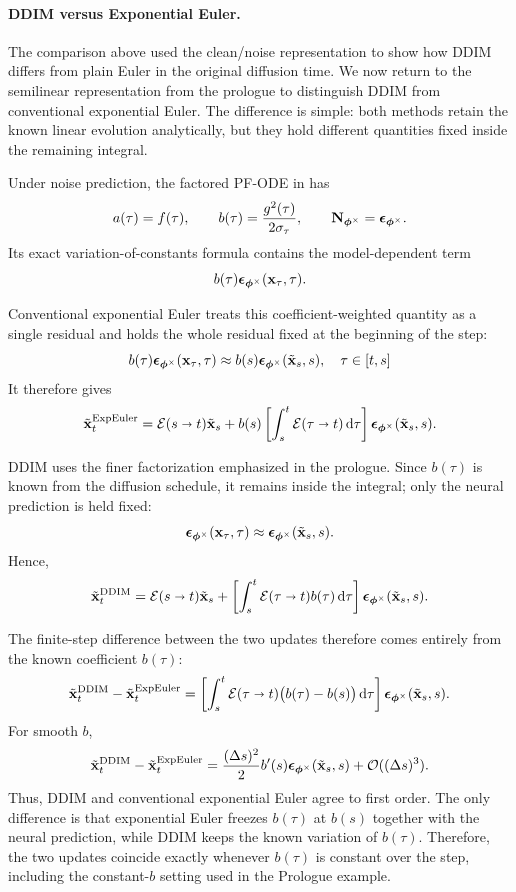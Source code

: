 \paragraph{DDIM versus Exponential Euler.}
The comparison above used the clean/noise representation to show how DDIM
differs from plain Euler in the original diffusion time. We now return to the
semilinear representation from the prologue to distinguish DDIM from
conventional exponential Euler. The difference is simple: both methods retain
the known linear evolution analytically, but they hold different quantities
fixed inside the remaining integral.

Under noise prediction, the factored PF-ODE in
 has
\[
a(\tau)=f(\tau),
\qquad
b(\tau)=\frac{g^2(\tau)}{2\sigma_\tau},
\qquad
{\mathbf{N}}_{\bm{\phi}^\times}
=
{\bm{\epsilon}}_{\bm{\phi}^\times}.
\]
Its exact variation-of-constants formula contains the model-dependent term
\[
b(\tau){\bm{\epsilon}}_{\bm{\phi}^\times}({\mathbf{x}}_\tau,\tau).
\]

Conventional exponential Euler treats this coefficient-weighted quantity as a
single residual and holds the whole residual fixed at the beginning of the
step:
\[
b(\tau){\bm{\epsilon}}_{\bm{\phi}^\times}({\mathbf{x}}_\tau,\tau)
\approx
b(s){\bm{\epsilon}}_{\bm{\phi}^\times}(\tilde{{\mathbf{x}}}_s,s), \quad\tau\in[t,s]
\]
It therefore gives
\[
\tilde{{\mathbf{x}}}_t^{\mathrm{ExpEuler}}
=
\mathcal E(s\shortrightarrow t)\tilde{{\mathbf{x}}}_s
+
b(s)
\left[
\int_s^t
\mathcal E(\tau\shortrightarrow t)
\mathop{}\!\mathrm{d}\tau
\right]
{\bm{\epsilon}}_{\bm{\phi}^\times}(\tilde{{\mathbf{x}}}_s,s).
\]

DDIM uses the finer factorization emphasized in the prologue. Since
$b(\tau)$ is known from the diffusion schedule, it remains inside the
integral; only the neural prediction is held fixed:
\[
{\bm{\epsilon}}_{\bm{\phi}^\times}({\mathbf{x}}_\tau,\tau)
\approx
{\bm{\epsilon}}_{\bm{\phi}^\times}(\tilde{{\mathbf{x}}}_s,s).
\]
Hence,
\[
\tilde{{\mathbf{x}}}_t^{\mathrm{DDIM}}
=
\mathcal E(s\shortrightarrow t)\tilde{{\mathbf{x}}}_s
+
\left[
\int_s^t
\mathcal E(\tau\shortrightarrow t)b(\tau)
\mathop{}\!\mathrm{d}\tau
\right]
{\bm{\epsilon}}_{\bm{\phi}^\times}(\tilde{{\mathbf{x}}}_s,s).
\]

The finite-step difference between the two updates therefore comes entirely
from the known coefficient $b(\tau)$:
\[
\tilde{{\mathbf{x}}}_t^{\mathrm{DDIM}}
-
\tilde{{\mathbf{x}}}_t^{\mathrm{ExpEuler}}
=
\left[
\int_s^t
\mathcal E(\tau\shortrightarrow t)
\bigl(b(\tau)-b(s)\bigr)
\mathop{}\!\mathrm{d}\tau
\right]
{\bm{\epsilon}}_{\bm{\phi}^\times}(\tilde{{\mathbf{x}}}_s,s).
\]
For smooth $b$,
\[
\tilde{{\mathbf{x}}}_t^{\mathrm{DDIM}}
-
\tilde{{\mathbf{x}}}_t^{\mathrm{ExpEuler}}
=
\frac{(\Delta s)^2}{2}
b'(s)
{\bm{\epsilon}}_{\bm{\phi}^\times}(\tilde{{\mathbf{x}}}_s,s)
+
\mathcal O((\Delta s)^3).
\]
Thus, DDIM and conventional exponential Euler agree to first order. The only
difference is that exponential Euler freezes $b(\tau)$ at $b(s)$ together
with the neural prediction, while DDIM keeps the known variation of
$b(\tau)$. Therefore, the two updates coincide exactly whenever $b(\tau)$ is constant
over the step, including the constant-$b$ setting used in the Prologue
example.

